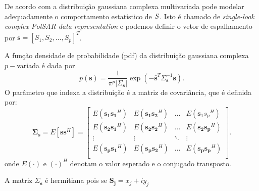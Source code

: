 De acordo com \cite{good} a distribuição gaussiana complexa multivariada pode modelar adequadamente o comportamento estatístico de $\boldmath S$. Isto é chamado de {\it single-look complex PolSAR data representation} e podemos definir o vetor de espalhamento por $\mathbf{s}=[S_1,S_2,\dots,S_p]^T$. 

A função densidade de probabilidade ({\boldmath pdf}) da distribuição gaussiana complexa $p-$variada é dada por
\begin{equation}\label{eqn1}
	p(\mathbf{s})=\frac{1}{\pi^p|\Sigma_{\mathbf{s}}|}\exp(-\bar{\mathbf{s}}^{T}\Sigma_{\mathbf{s}}^{-1}\mathbf{s}).
\end{equation}
O parâmetro que indexa a distribuição é a matriz de covariância, que é definida por:
\begin{equation}\label{eqn2}
	\mathbf{ \Sigma_{s}} = E[\mathbf{ss}^H] = \left[
\begin{array}{cccc}
	E(\mathbf{s_1s_1}^H)  & E(\mathbf{s_1s_2}^H) &\hdots & E({\mathbf s_1s_p}^H) \\
	E(\mathbf{ s_2s_1}^H)  & E(\mathbf {s_2 s_2}^H) &\hdots &E(\mathbf {s_2 s_p}^H)\\
        \vdots&\vdots &\ddots &\vdots\\
	E(\mathbf{ s_ps_1}^H)  & E(\mathbf {s_ps_2}^H) &\hdots &E(\mathbf {s_ps_p}^H)\\
\end{array}
\right].
\end{equation}
onde $E(\cdot)$ e $(\cdot)^H$ denotam o valor esperado e o conjugado transposto.

A matriz {\boldmath$\Sigma_{\mathbf{s}}$} é hermitiana pois se $\mathbf {S_j}= x_j+iy_j $

